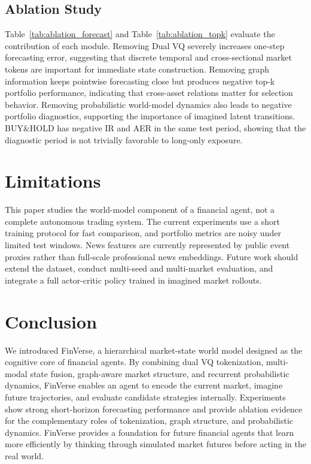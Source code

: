 \documentclass[letterpaper]{article}
\begin{document}
\subsection{Ablation Study}
Table~\ref{tab:ablation_forecast} and Table~\ref{tab:ablation_topk} evaluate the contribution of each module. Removing Dual VQ severely increases one-step forecasting error, suggesting that discrete temporal and cross-sectional market tokens are important for immediate state construction. Removing graph information keeps pointwise forecasting close but produces negative top-k portfolio performance, indicating that cross-asset relations matter for selection behavior. Removing probabilistic world-model dynamics also leads to negative portfolio diagnostics, supporting the importance of imagined latent transitions. BUY\&HOLD has negative IR and AER in the same test period, showing that the diagnostic period is not trivially favorable to long-only exposure.

\section{Limitations}
This paper studies the world-model component of a financial agent, not a complete autonomous trading system. The current experiments use a short training protocol for fast comparison, and portfolio metrics are noisy under limited test windows. News features are currently represented by public event proxies rather than full-scale professional news embeddings. Future work should extend the dataset, conduct multi-seed and multi-market evaluation, and integrate a full actor-critic policy trained in imagined market rollouts.

\section{Conclusion}
We introduced FinVerse, a hierarchical market-state world model designed as the cognitive core of financial agents. By combining dual VQ tokenization, multi-modal state fusion, graph-aware market structure, and recurrent probabilistic dynamics, FinVerse enables an agent to encode the current market, imagine future trajectories, and evaluate candidate strategies internally. Experiments show strong short-horizon forecasting performance and provide ablation evidence for the complementary roles of tokenization, graph structure, and probabilistic dynamics. FinVerse provides a foundation for future financial agents that learn more efficiently by thinking through simulated market futures before acting in the real world.
\end{document}
